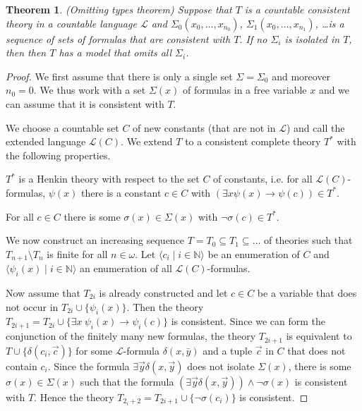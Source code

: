 \documentclass[10pt]{amsart}
\renewcommand{\L}{\mathcal{L}}
\newcommand{\NNN}{\mathbb{N}}
\newtheorem{theorem}{Theorem}[subsection]
\theoremstyle{definition}
\theoremstyle{remark}
\newenvironment{enumerate-(a)}{\begin{enumerate}[label={\upshape (\alph*)}, leftmargin=2pc]}{\end{enumerate}}
\begin{document}
\begin{theorem} (Omitting types theorem) \label{omitting types}
Suppose that $T$ is a countable consistent theory in a countable language $\L$ and $\Sigma_0(x_0,\dots,x_{n_0})$, $\Sigma_1(x_0,\dots,x_{n_1})$, \dots is a sequence of sets of formulas that are consistent with $T$. If no $\Sigma_i$ is isolated in $T$, then then $T$ has a model that omits all $\Sigma_i$. 
\end{theorem} 
\begin{proof} 
We first assume that there is only a single set $\Sigma=\Sigma_0$ and moreover $n_0=0$. We thus work with a set $\Sigma(x)$ of formulas in a free variable $x$ and we can assume that it is consistent with $T$. 

We choose a countable set $C$ of new constants (that are not in $\L$) and call the extended language $\L(C)$. We extend $T$ to a consistent complete theory $T^*$ with the following properties.
\begin{enumerate-(a)} 
\item 
$T^*$ is a Henkin theory with respect to the set $C$ of constants, i.e. for all $\L(C)$-formulas, $\psi(x)$ there is a constant $c\in C$ with $(\exists x \psi(x)\rightarrow \psi(c))\in T^*$. 
\item 
For all $c\in C$ there is some $\sigma(x)\in \Sigma(x)$ with $\neg\sigma(c)\in T^*$. 
\end{enumerate-(a)} 

We now construct an increasing sequence $T=T_0\subseteq T_1\subseteq \dots$ of theories such that $T_{n+1}\setminus T_n$ is finite for all $n\in\omega$. Let $\langle c_i\mid i\in\NNN\rangle$ be an enumeration of $C$ and $\langle \psi_i(x)\mid i\in\NNN\rangle$ an enumeration of all $\L(C)$-formulas. 

Now assume that $T_{2i}$ is already constructed and let $c\in C$ be a variable that does not occur in $T_{2i}\cup\{\psi_i(x)\}$. Then the theory $T_{2i+1}=T_{2i}\cup\{\exists x\ \psi_i(x)\rightarrow \psi_i(c)\}$ is consistent. Since we can form the conjunction of the finitely many new formulas, the theory $T_{2i+1}$ is equivalent to $T\cup\{\delta(c_i,\vec{c})\}$ for some $\L$-formula $\delta(x,\bar{y})$ and a tuple $\vec{c}$ in $C$ that does not contain $c_i$. Since the formula $\exists \vec{y} \delta(x,\vec{y})$ does not isolate $\Sigma(x)$, there is some $\sigma(x)\in \Sigma(x)$ such that the formula $(\exists \vec{y} \delta(x,\vec{y}))\wedge\neg \sigma(x)$ is consistent with $T$. Hence the theory $T_{2_i+2}=T_{2i+1}\cup\{\neg\sigma(c_i)\}$ is consistent. 


\end{proof}
\end{document}
